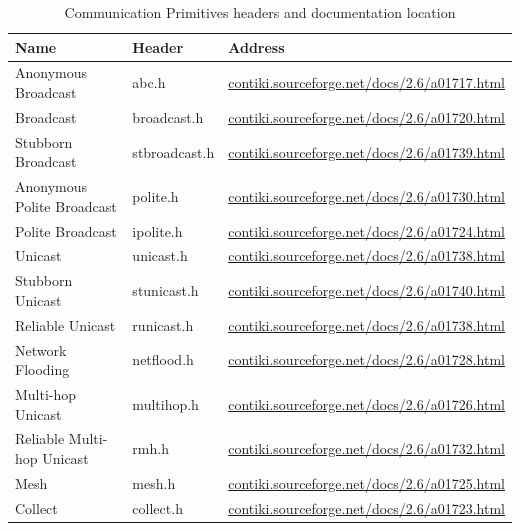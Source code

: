 \begin{table}[H]
	\centering
	\begin{tabular}{ | l | l | l | }
		\hline
		Name & Header & Address \\
		\hline
		Anonymous Broadcast & abc.h & \url{contiki.sourceforge.net/docs/2.6/a01717.html} \\
		Broadcast & broadcast.h & \url{contiki.sourceforge.net/docs/2.6/a01720.html} \\
		Stubborn Broadcast & stbroadcast.h & \url{contiki.sourceforge.net/docs/2.6/a01739.html} \\
		Anonymous Polite Broadcast & polite.h & \url{contiki.sourceforge.net/docs/2.6/a01730.html} \\
		Polite Broadcast & ipolite.h & \url{contiki.sourceforge.net/docs/2.6/a01724.html} \\
		Unicast & unicast.h & \url{contiki.sourceforge.net/docs/2.6/a01738.html} \\
		Stubborn Unicast & stunicast.h & \url{contiki.sourceforge.net/docs/2.6/a01740.html} \\
		Reliable Unicast & runicast.h & \url{contiki.sourceforge.net/docs/2.6/a01738.html} \\
		Network Flooding & netflood.h & \url{contiki.sourceforge.net/docs/2.6/a01728.html} \\
		Multi-hop Unicast & multihop.h & \url{contiki.sourceforge.net/docs/2.6/a01726.html} \\
		Reliable Multi-hop Unicast & rmh.h & \url{contiki.sourceforge.net/docs/2.6/a01732.html} \\
		\hline
		\hline
		Mesh & mesh.h & \url{contiki.sourceforge.net/docs/2.6/a01725.html} \\
		Collect & collect.h & \url{contiki.sourceforge.net/docs/2.6/a01723.html} \\
		\hline
	\end{tabular}
	\caption{Communication Primitives headers and documentation location}
\end{table}



